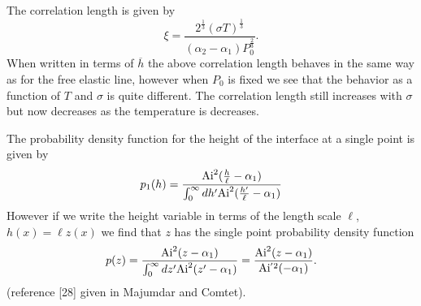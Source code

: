 The correlation length is given by
\begin{equation}
\xi = \frac{2^\frac{1}{3}(\sigma T)^\frac{1}{3}}{(\alpha_2-\alpha_1)P_0^\frac{2}{3}}.
\end{equation}
When written in terms of $\overline h$ the above correlation length behaves in the same way
as for the free elastic line, however when $P_0$ is fixed we see that the behavior as a function 
of $T$ and $\sigma$ is quite different. The correlation length still increases with $\sigma$ but now decreases as the temperature is decreases.

The probability density function for the height of the interface at a single point is given
by
\begin{equation}
p_1(h) = \frac{{\rm Ai}^2(\frac{h}{\ell}-\alpha_1)}{\int_0^\infty dh' {\rm Ai}^2(\frac{h'}{\ell}-\alpha_1)}
\end{equation}
However if we write the height variable in terms of the length scale $\ell$, $h(x)= \ell z(x)$ we find that $z$ has the single point probability density function
\begin{equation}
p(z)= \frac{{\rm Ai}^2(z-\alpha_1)}{\int_0^\infty dz' {\rm Ai}^2(z'-\alpha_1)}
=\frac{{\rm Ai}^2(z-\alpha_1)}{{\rm Ai}{^{'2}}(-\alpha_1)}
\label{airyprob}.
\end{equation}
(reference [28] given in Majumdar and Comtet).


